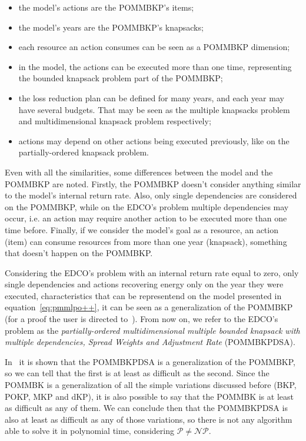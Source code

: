\begin{itemize}
  \item the model's actions are the POMMBKP's items;
  \item the model's years are the POMMBKP's knapsacks;
  \item each resource an action consumes can be seen as a POMMBKP dimension;
  \item in the model, the actions can be executed more than one time, representing the bounded knapsack problem part of the POMMBKP;
  \item the loss reduction plan can be defined for many years, and each year may have several budgets. That may be seen as the multiple knapsacks problem and multidimensional knapsack problem respectively;
  \item actions may depend on other actions being executed previously, like on the partially-ordered knapsack problem.
\end{itemize}

Even with all the similarities, some differences between the model and the POMMBKP are noted. Firstly, the 
POMMBKP doesn't consider anything similar to the model's internal return rate. Also, only single dependencies
are considered on the POMMBKP, while on the EDCO's problem multiple dependencies may occur, i.e. an action may require
another action to be executed more than one time before. Finally, if we consider the model's goal as a resource, 
an action (item) can consume resources from more than one year (knapsack), something that doesn't happen on the POMMBKP.

Considering the EDCO's problem with an internal return rate equal to zero, only single dependencies and actions recovering energy 
only on the year they were executed, characteristics that can be representend on the model presented in equation~\ref{eq:pmmlpo++}, 
it can be seen as a generalization of the POMMBKP (for a proof the user is directed to~\cite{Moreira2015}). From now on, we refer to 
the EDCO's problem as the \textit{partially-ordered multidimensional multiple bounded knapsack with multiple dependencies, 
Spread Weights and Adjustment Rate} (POMMBKPDSA).

In~\cite{Moreira2015} it is shown that the POMMBKPDSA is a generalization of the POMMBKP, so we can tell 
that the first is at least as difficult as the second. Since the POMMBK is a generalization of all the simple 
variations discussed before (BKP, POKP, MKP and dKP), it is also possible to say that the POMMBK is at least as 
difficult as any of them. We can conclude then that the POMMBKPDSA is also at least as difficult as any of those 
variations, so there is not any algorithm able to solve it in polynomial time, considering $\mathcal{P} \ne \mathcal{NP}$. 
